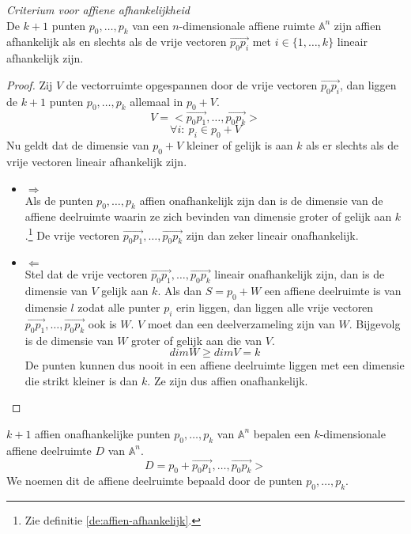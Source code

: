 \documentclass[main.tex]{subfiles}
\begin{document}
\begin{st}
  \label{st:critirium-affien-afhankelijk}
  \emph{Criterium voor affiene afhankelijkheid}\\
  De $k+1$ punten $p_{0},\dotsc,p_{k}$ van een $n$-dimensionale affiene ruimte $\mathbb{A}^{n}$ zijn affien afhankelijk als en slechts als de vrije vectoren $\vec{p_{0}p_{i}}$ met $i \in \{1,\dotsc,k\}$ lineair afhankelijk zijn.

  \begin{proof}
    Zij $V$ de vectorruimte opgespannen door de vrije vectoren $\overrightarrow{p_{0}p_{i}}$, dan liggen de $k+1$ punten $p_{0},\dotsc,p_{k}$ allemaal in $p_{0} + V$.
    \[ V = <\overrightarrow{p_{0}p_{1}},\dotsc,\overrightarrow{p_{0}p_{k}}> \]
    \[ \forall i:\ p_{i} \in p_{0}+V \]
    Nu geldt dat de dimensie van $p_{0} + V$ kleiner of gelijk is aan $k$ als er slechts als de vrije vectoren lineair afhankelijk zijn.
    \begin{itemize}
    \item $\Rightarrow$\\
      Als de punten $p_{0},\dotsc,p_{k}$ affien onafhankelijk zijn dan is de dimensie van de affiene deelruimte waarin ze zich bevinden van dimensie groter of gelijk aan $k$.\footnote{Zie definitie \ref{de:affien-afhankelijk}.}
      De vrije vectoren $\overrightarrow{p_{0}p_{1}},\dotsc,\overrightarrow{p_{0}p_{k}}$ zijn dan zeker lineair onafhankelijk.
    \item $\Leftarrow$\\
      Stel dat de vrije vectoren $\overrightarrow{p_{0}p_{1}},\dotsc,\overrightarrow{p_{0}p_{k}}$ lineair onafhankelijk zijn, dan is de dimensie van $V$ gelijk aan $k$.
      Als dan $S = p_{0}+W$ een affiene deelruimte is van dimensie $l$ zodat alle punter $p_{i}$ erin liggen, dan liggen alle vrije vectoren $\overrightarrow{p_{0}p_{1}},\dotsc,\overrightarrow{p_{0}p_{k}}$ ook is $W$. $V$ moet dan een deelverzameling zijn van $W$. Bijgevolg is de dimensie van $W$ groter of gelijk aan die van $V$.
      \[ dim W \ge dim V = k \]
      De punten kunnen dus nooit in een affiene deelruimte liggen met een dimensie die strikt kleiner is dan $k$.
      Ze zijn dus affien onafhankelijk.
    \end{itemize}
  \end{proof}
\end{st}

\begin{gev}
  $k+1$ affien onafhankelijke punten $p_{0},\dotsc,p_{k}$ van $\mathbb{A}^{n}$ bepalen een $k$-dimensionale affiene deelruimte $D$ van $\mathbb{A}^{n}$.
  \[ D = p_{0} + \overrightarrow{p_{0}p_{1}},\dotsc,\overrightarrow{p_{0}p_{k}}> \]
  We noemen dit de affiene deelruimte bepaald door de punten $p_{0},\dotsc,p_{k}$.

\end{gev}
\end{document}
